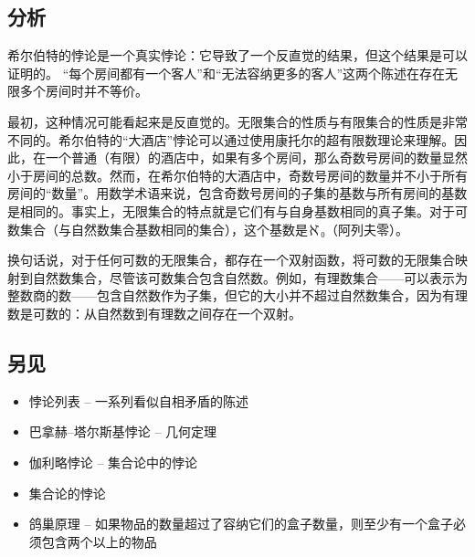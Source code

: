 \subsection{分析}  
希尔伯特的悖论是一个真实悖论：它导致了一个反直觉的结果，但这个结果是可以证明的。 “每个房间都有一个客人”和“无法容纳更多的客人”这两个陈述在存在无限多个房间时并不等价。

最初，这种情况可能看起来是反直觉的。无限集合的性质与有限集合的性质是非常不同的。希尔伯特的“大酒店”悖论可以通过使用康托尔的超有限数理论来理解。因此，在一个普通（有限）的酒店中，如果有多个房间，那么奇数号房间的数量显然小于房间的总数。然而，在希尔伯特的大酒店中，奇数号房间的数量并不小于所有房间的“数量”。用数学术语来说，包含奇数号房间的子集的基数与所有房间的基数是相同的。事实上，无限集合的特点就是它们有与自身基数相同的真子集。对于可数集合（与自然数集合基数相同的集合），这个基数是ℵ₀（阿列夫零）。

换句话说，对于任何可数的无限集合，都存在一个双射函数，将可数的无限集合映射到自然数集合，尽管该可数集合包含自然数。例如，有理数集合——可以表示为整数商的数——包含自然数作为子集，但它的大小并不超过自然数集合，因为有理数是可数的：从自然数到有理数之间存在一个双射。
\subsection{另见}  
\begin{itemize}
\item 悖论列表 – 一系列看似自相矛盾的陈述  
\item 巴拿赫–塔尔斯基悖论 – 几何定理  
\item 伽利略悖论 – 集合论中的悖论  
\item 集合论的悖论  
\item 鸽巢原理 – 如果物品的数量超过了容纳它们的盒子数量，则至少有一个盒子必须包含两个以上的物品
\end{itemize}
